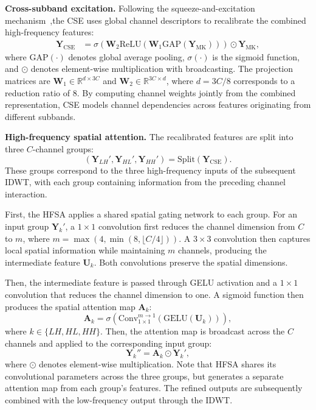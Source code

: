 \documentclass[pdflatex,sn-nature]{sn-jnl}
\begin{document}
\noindent\textbf{Cross-subband excitation.}
Following the squeeze-and-excitation mechanism~\cite{Hu2018SENet},the CSE uses global channel descriptors to recalibrate the combined high-frequency features:
\begin{equation}
\begin{aligned}
\mathbf{Y}_{\mathrm{CSE}}
&=
\sigma\!\left(
\mathbf{W}_2
\mathrm{ReLU}\!\left(
\mathbf{W}_1
\mathrm{GAP}(
    \mathbf{Y}_{\mathrm{MK}})
\right)\right)\odot
\mathbf{Y}_{\mathrm{MK}},
\end{aligned}
\label{eq:mdrm_cse}
\end{equation}
where $\mathrm{GAP}(\cdot)$ denotes global average pooling, $\sigma(\cdot)$ is the sigmoid function, and $\odot$ denotes element-wise multiplication with broadcasting. The projection matrices are $\mathbf{W}_1\in\mathbb{R}^{d\times3C}$ and $\mathbf{W}_2\in\mathbb{R}^{3C\times d}$, where $d=3C/8$ corresponds to a reduction ratio of $8$. By computing channel weights jointly from the combined representation, CSE models channel dependencies across features originating from different subbands.


\noindent\textbf{High-frequency spatial attention.}
The recalibrated features are split into three $C$-channel
groups:
\begin{equation}
\left(
\mathbf{Y}_{LH}',
\mathbf{Y}_{HL}',
\mathbf{Y}_{HH}'
\right)
=
\mathrm{Split}\!\left(\mathbf{Y}_{\mathrm{CSE}}\right).
\label{eq:mdrm_split}
\end{equation}
These groups correspond to the three high-frequency inputs of the subsequent IDWT, with each group containing information from the preceding channel interaction.

First, the HFSA applies a shared spatial gating network to each group. For an input group $\mathbf{Y}_k'$, a $1\times1$ convolution first reduces the channel dimension from $C$ to $m$, where $m=\max(4,\min(8,\lfloor C/4\rfloor))$. A $3\times3$ convolution then captures local spatial information while maintaining $m$ channels, producing the intermediate feature $\mathbf{U}_k$. Both convolutions preserve the spatial dimensions.

Then, the intermediate feature is passed through GELU activation and a $1\times1$ convolution that reduces the channel dimension to one. A sigmoid function then produces the spatial attention map $\mathbf{A}_k$:
\begin{equation}
\mathbf{A}_k
=
\sigma\!\left(
\mathrm{Conv}_{1\times1}^{m\rightarrow1}\!\left(
\mathrm{GELU}(\mathbf{U}_k)
\right)\right),
\end{equation}
where $k\in\{LH,HL,HH\}$. Then, the attention map is broadcast across the $C$ channels and applied to the corresponding input group:
\begin{equation}
\mathbf{Y}_k''
=
\mathbf{A}_k\odot\mathbf{Y}_k',
\label{eq:mdrm_hfsa}
\end{equation}
where $\odot$ denotes element-wise multiplication. Note that HFSA shares its convolutional parameters across the three groups, but generates a separate attention map from each group's features. The refined outputs are subsequently combined with the low-frequency output through the IDWT.
\end{document}
